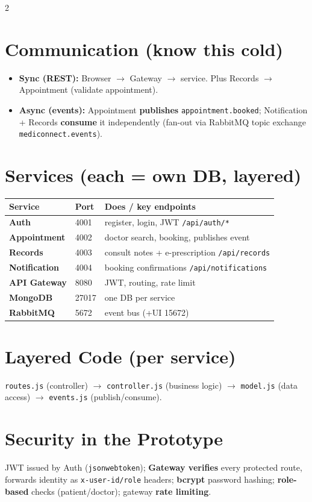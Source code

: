 \documentclass[10pt,a4paper]{article}
\newcommand{\hd}[1]{\textbf{\color{navy}#1}}
\newcommand{\code}[1]{\texttt{\footnotesize #1}}
\begin{document}
\begin{multicols}{2}
\section{Communication (know this cold)}
{\footnotesize
\begin{itemize}
  \item \hd{Sync (REST):} Browser $\rightarrow$ Gateway $\rightarrow$ service. Plus
        Records $\rightarrow$ Appointment (validate appointment).
  \item \hd{Async (events):} Appointment \textbf{publishes} \code{appointment.booked};
        Notification + Records \textbf{consume} it independently (fan-out via RabbitMQ topic
        exchange \code{mediconnect.events}).
\end{itemize}}

\columnbreak

\section{Services (each = own DB, layered)}
{\scriptsize
\begin{tabular}{@{}>{\bfseries}p{2.05cm} p{0.75cm} p{4.6cm}@{}}
\toprule
\textbf{Service} & \textbf{Port} & \textbf{Does / key endpoints}\\
\midrule
Auth & 4001 & register, login, JWT \code{/api/auth/*}\\
Appointment & 4002 & doctor search, booking, publishes event\\
Records & 4003 & consult notes + e-prescription \code{/api/records}\\
Notification & 4004 & booking confirmations \code{/api/notifications}\\
API Gateway & 8080 & JWT, routing, rate limit\\
MongoDB & 27017 & one DB per service\\
RabbitMQ & 5672 & event bus (+UI 15672)\\
\bottomrule
\end{tabular}}

\section{Layered Code (per service)}
{\footnotesize \code{routes.js} (controller) $\rightarrow$ \code{controller.js} (business logic)
$\rightarrow$ \code{model.js} (data access) $\rightarrow$ \code{events.js} (publish/consume).}

\section{Security in the Prototype}
{\footnotesize JWT issued by Auth (\code{jsonwebtoken}); \textbf{Gateway verifies} every protected
route, forwards identity as \code{x-user-id/role} headers; \textbf{bcrypt} password hashing;
\textbf{role-based} checks (patient/doctor); gateway \textbf{rate limiting}.}


\end{multicols}
\end{document}
